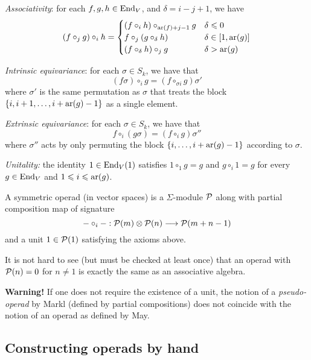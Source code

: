 \begin{tenumerate}
\item \emph{Associativity}: for
each $f,g,h\in\operatorname{End}_V$, and $\delta = i-j+1$,
we have
\[ 
(f \circ_j g) \circ_i h  = 
 	\begin{cases} 
 		 (f \circ_i h) \circ_{\operatorname{ar}(f)+j-1} g
 		  	& \delta \leqslant 0  \\
 		  	f\circ_j (g \circ_\delta h) &
 		  	\delta\in [1,\operatorname{ar}(g)] \\
 		  	(f \circ_\delta h) \circ_j g & \delta > \operatorname{ar}(g)
 		   \end{cases}
 		 \]
\item \emph{Intrinsic equivariance}: for
each $\sigma\in S_k$, we have that
\[  (f\sigma) \circ_i g  = (f\circ_{\sigma i} g)\sigma'\]
where $\sigma'$ is the same permutation as $\sigma$
that treats the block $\{i,i+1,\ldots,i+\operatorname{ar}(g)-1\}$
as a single element. 
\item \emph{Extrinsic equivariance}: 
 for each $\sigma\in S_k$, we have that
\[  f \circ_i (g\sigma)  = (f\circ_i g)\sigma''\]
where $\sigma''$ acts by only permuting the
block $\{i,\ldots,i+\operatorname{ar}(g)-1\}$ according
to $\sigma$.
\item \emph{Unitality:} the identity $1\in\operatorname{End}_V(1)$
satisfies $1 \circ_1 g = g$ and $g\circ_i 1 = g$ for every $g\in\operatorname{End}_V$ and $1\leqslant i\leqslant \operatorname{ar}(g)$.
\end{tenumerate}

\begin{definition}
A symmetric operad (in vector spaces) is a
$\Sigma$-module ${\mathcal{P}}$ along with partial composition
map of signature
\[ -\circ_i -  : {\mathcal{P}}(m)\otimes {\mathcal{P}}(n) 
	\longrightarrow {\mathcal{P}}(m+n-1) \]
and a unit $1\in{\mathcal{P}}(1)$ satisfying the axioms above.
\end{definition}

It is not hard to see (but must be checked at least once)
that an operad with ${\mathcal{P}}(n) = 0$ for $n\neq 1$ is
exactly the same as an associative algebra. 

\textbf{Warning!} If one does not require
the existence of a unit, the notion of a
\emph{pseudo-operad} by Markl (defined by partial
compositions) does not coincide with the
notion of an operad as defined by May.


\subsection{Constructing operads by hand}

